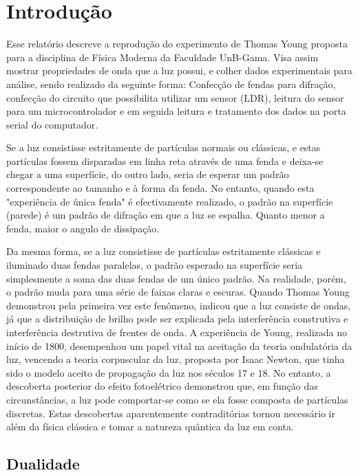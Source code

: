 \section{Introdução}\label{intro}
Esse relatório descreve a reprodução do experimento de Thomas Young proposta para a disciplina de Física Moderna da Faculdade UnB-Gama. Visa assim mostrar propriedades de onda que a luz possui, e colher dados experimentais para análise, sendo realizado da seguinte forma: Confecção de fendas para difração, confecção do circuito que possibilita utilizar um sensor (LDR), leitura do sensor para um microcontrolador e em seguida leitura e tratamento dos dados na porta serial do computador\cite{feynman}.

Se a luz consistisse estritamente de  partículas  normais ou clássicas, e estas partículas fossem disparadas em linha reta através de uma fenda e deixa-se chegar a uma superfície, do outro lado, seria de esperar um padrão correspondente ao tamanho e à forma da fenda. No entanto, quando esta "experiência de única fenda" é efectivamente realizado, o padrão na superfície (parede) é um padrão de difração em que a luz se espalha. Quanto menor a fenda, maior o angulo de dissipação.

Da mesma forma, se a luz consistisse de partículas estritamente clássicas e iluminado duas fendas paralelas, o padrão esperado na superfície seria simplesmente a soma das duas fendas de um único padrão. Na realidade, porém, o padrão muda para uma série de faixas claras e escuras. Quando Thomas Young demonstrou pela primeira vez este fenômeno, indicou que a luz consiste de ondas, já que a distribuição de brilho pode ser explicada pela interferência construtiva e interferência destrutiva de frentes de onda. A experiência de Young, realizada no início de 1800, desempenhou um papel vital na aceitação da teoria ondulatória da luz, vencendo a teoria corpuscular da luz, proposta por Isaac Newton, que tinha sido o modelo aceito de propagação da luz nos séculos 17 e 18. No entanto, a descoberta posterior do efeito fotoelétrico demonstrou que, em função das circunstâncias, a luz pode comportar-se como se ela fosse composta de partículas discretas. Estas descobertas aparentemente contraditórias tornou necessário ir além da física clássica e tomar a natureza quântica da luz em conta.

\subsection{Dualidade}\label{dualidade}

